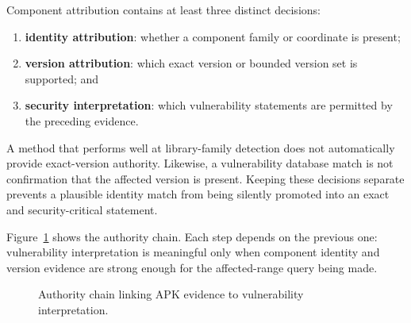 Component attribution contains at least three distinct decisions:

\begin{enumerate}
  \item \textbf{identity attribution}: whether a component family or
    coordinate is present;
  \item \textbf{version attribution}: which exact version or bounded version
    set is supported; and
  \item \textbf{security interpretation}: which vulnerability statements are
    permitted by the preceding evidence.
\end{enumerate}

A method that performs well at library-family detection does not
automatically provide exact-version authority. Likewise, a vulnerability
database match is not confirmation that the affected version is present.
Keeping these decisions separate prevents a plausible identity match from
being silently promoted into an exact and security-critical statement.

Figure~\ref{fig:master-claim-authority-chain} shows the authority chain. Each
step depends on the previous one: vulnerability interpretation is meaningful
only when component identity and version evidence are strong enough for the
affected-range query being made.

\begin{figure}[H]
\centering
{}
\caption{Authority chain linking APK evidence to vulnerability interpretation.}
\label{fig:master-claim-authority-chain}
\end{figure}

